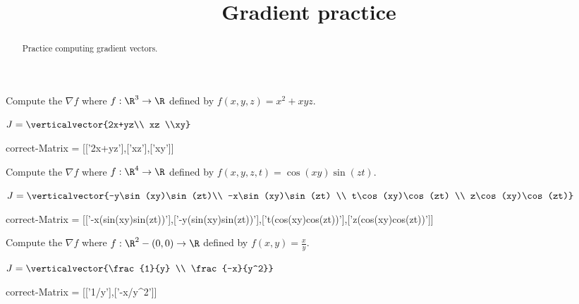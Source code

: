 \documentclass{ximera}
\title{Gradient practice}
\begin{document}
	\begin{abstract}
		Practice computing gradient vectors.
	\end{abstract}
	
	\begin{question}	
		Compute the $\nabla f$ where $f:\R^3 \to \R$ defined by $f(x,y,z) = x^2+xyz$.
		\begin{solution}
		\begin{hint}
			\(J = \verticalvector{2x+yz\\ xz \\xy}\)
		\end{hint}
		\begin{matrix-answer}[name=J]
			correct-Matrix  = [['2x+yz'],['xz'],['xy']]
		\end{matrix-answer}
		\end{solution}
	\end{question}
	
	\begin{question}	
		Compute the $\nabla f$ where $f:\R^4 \to \R$ defined by $f(x,y,z,t) = \cos(xy)\sin(zt)$.
		\begin{solution}
		\begin{hint}
			\(J = \verticalvector{-y\sin(xy)\sin(zt)\\ -x\sin(xy)\sin(zt) \\ t\cos(xy)\cos(zt) \\ z\cos(xy)\cos(zt)}\)
		\end{hint}
		\begin{matrix-answer}[name=J]
			correct-Matrix  = [['-x(sin(xy)sin(zt))'],['-y(sin(xy)sin(zt))'],['t(cos(xy)cos(zt))'],['z(cos(xy)cos(zt))']]
		\end{matrix-answer}
		\end{solution}
	\end{question}
	
	\begin{question}	
		Compute the $\nabla f$ where $f:\R^2-{(0,0)} \to \R$ defined by $f(x,y) = \frac{x}{y}$.
		\begin{solution}
		\begin{hint}
			\(J = \verticalvector{\frac{1}{y} \\ \frac{-x}{y^2}}\)
		\end{hint}
		\begin{matrix-answer}[name=J]
			correct-Matrix  = [['1/y'],['-x/y^2']]
		\end{matrix-answer}
		\end{solution}
	\end{question}

	
\end{document}
